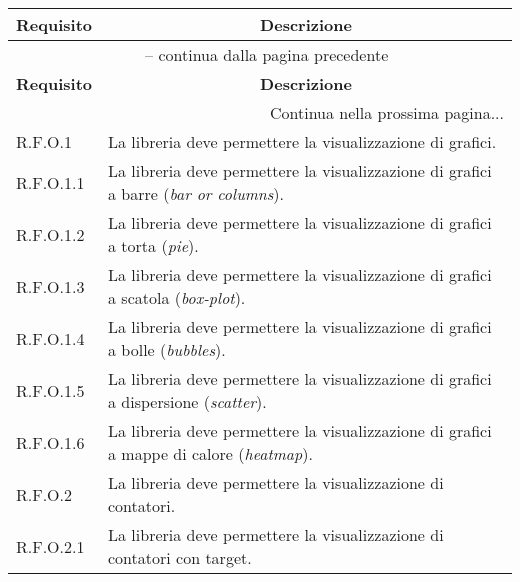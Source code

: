 \begin{center}
    \begin{longtable}{|p{2.5cm}|p{10cm}|}
        \hline
        \rowcolor{gray!30}
        \textbf{Requisito} & \multicolumn{1}{c|}{\textbf{Descrizione}}                                                          \\
        \hline
        \endfirsthead
        \hline
        \multicolumn{2}{|c|}{{\tablename\ \thetable{} -- continua dalla pagina precedente}}                                     \\
        \hline
        \rowcolor{gray!30}
        \textbf{Requisito} & \multicolumn{1}{c|}{\textbf{Descrizione}}                                                          \\
        \endhead
        \hline
        \multicolumn{2}{|r|}{{Continua nella prossima pagina...}}                                                               \\
        \hline
        \endfoot
        \hline
        \endlastfoot
        R.F.O.1            & La libreria deve permettere la visualizzazione di grafici.                                         \\
        \hline
        R.F.O.1.1          & La libreria deve permettere la visualizzazione di grafici a barre (\textit{bar or columns}).       \\
        \hline
        R.F.O.1.2          & La libreria deve permettere la visualizzazione di grafici a torta (\textit{pie}).                  \\
        \hline
        R.F.O.1.3          & La libreria deve permettere la visualizzazione di grafici a scatola (\textit{box-plot}).           \\
        \hline
        R.F.O.1.4          & La libreria deve permettere la visualizzazione di grafici a bolle (\textit{bubbles}).              \\
        \hline
        R.F.O.1.5          & La libreria deve permettere la visualizzazione di grafici a dispersione (\textit{scatter}).        \\
        \hline
        R.F.O.1.6          & La libreria deve permettere la visualizzazione di grafici a mappe di calore (\textit{heatmap}).    \\
        \hline
        R.F.O.2            & La libreria deve permettere la visualizzazione di contatori.                                       \\
        \hline
        R.F.O.2.1          & La libreria deve permettere la visualizzazione di contatori con target.                            \\

\end{longtable}
\end{center}

